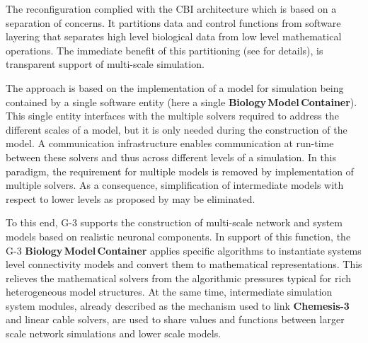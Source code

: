 \documentclass[11pt,3p,twocolumn]{JMN}
\begin{document}
The reconfiguration complied with the CBI architecture which is based on a separation of concerns. It partitions data and control functions from software layering that separates high level biological data from low level mathematical operations. The immediate benefit of this partitioning (see \cite{cornelis12} for details), is transparent support of multi-scale simulation.

The approach is based on the implementation of a model for simulation being contained by a single software entity (here a single {\bf Biology\,Model\,Container}). This single entity interfaces with the multiple solvers required to address the different scales of a model, but it is only needed during the construction of the model. A communication infrastructure enables communication at run-time between these solvers and thus across different levels of a simulation. In this paradigm, the requirement for multiple models is removed by implementation of multiple solvers. As a consequence, simplification of intermediate models with respect to lower levels as proposed by \cite{Sejnowski:1988fk} may be eliminated. 




To this end, G-3 supports the construction of multi-scale network and system models based on realistic neuronal components.  In support of
this function, the G-3 {\bf Biology\,Model\,Container} applies specific algorithms to instantiate systems level connectivity models and convert them to mathematical representations. This relieves the mathematical solvers from the algorithmic pressures typical for rich heterogeneous model structures.  At the same time, intermediate simulation system modules, already described as the mechanism used to link {\bf Chemesis-3} and linear cable solvers, are used to share values and functions between larger scale network simulations and lower scale models.
\end{document}
